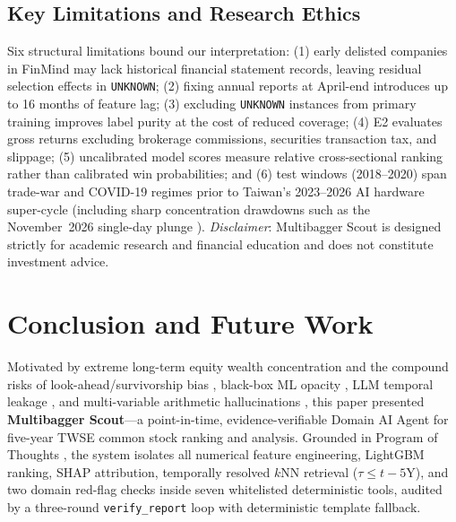 \documentclass[conference]{IEEEtran}
\begin{document}
\subsection{Key Limitations and Research Ethics}
Six structural limitations bound our interpretation: (1) early delisted companies in FinMind may lack historical financial statement records, leaving residual selection effects in \texttt{UNKNOWN}; (2) fixing annual reports at April-end introduces up to 16 months of feature lag; (3) excluding \texttt{UNKNOWN} instances from primary training improves label purity at the cost of reduced coverage; (4) E2 evaluates gross returns excluding brokerage commissions, securities transaction tax, and slippage; (5) uncalibrated model scores measure relative cross-sectional ranking rather than calibrated win probabilities; and (6) test windows (2018--2020) span trade-war and COVID-19 regimes prior to Taiwan's 2023--2026 AI hardware super-cycle (including sharp concentration drawdowns such as the November~2026 single-day plunge \cite{twse2026}). \emph{Disclaimer}: Multibagger Scout is designed strictly for academic research and financial education and does not constitute investment advice.

\section{Conclusion and Future Work}

Motivated by extreme long-term equity wealth concentration \cite{bessembinder2023, bessembinder2026} and the compound risks of look-ahead/survivorship bias \cite{gao2026}, black-box ML opacity \cite{gu2020}, LLM temporal leakage \cite{he2025chrono, didisheim2025}, and multi-variable arithmetic hallucinations \cite{faith2025, alphaarena2026}, this paper presented \textbf{Multibagger Scout}---a point-in-time, evidence-verifiable Domain AI Agent for five-year TWSE common stock ranking and analysis. Grounded in Program of Thoughts \cite{chen2023pot, agenticrag2026}, the system isolates all numerical feature engineering, LightGBM ranking, SHAP attribution, temporally resolved $k$NN retrieval ($\tau \le t - 5\text{Y}$), and two domain red-flag checks inside seven whitelisted deterministic tools, audited by a three-round \texttt{verify\_report} loop with deterministic template fallback.
\end{document}
